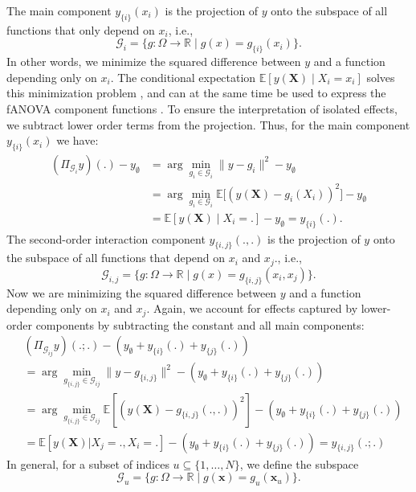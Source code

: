 The main component $y_{\{i\}}(x_i)$ is the projection of $y$ onto the subspace of all 
functions that only depend on $x_i$, i.e.,
\[
\mathcal{G}_i = \{ g : \Omega \to \mathbb{R} \mid g(x) = g_{\{i\}}(x_i) \}.
\]
In other words, we minimize the squared difference between $y$ and a function depending 
only on $x_i$.
The conditional expectation $\mathbb{E}[y(\boldsymbol{X}) \mid X_i = x_i]$ solves this 
minimization problem \citep{Vaart_1998}, and can at the same time be used to 
express the fANOVA component functions \citep{muehlenstaedt2012}. To ensure the interpretation of isolated effects, we subtract lower order terms from the projection.
Thus, for the main component $y_{\{i\}}(x_i)$ we have:
\begin{align*}
    (\Pi_{\mathcal{G}_i}y)(.) - y_{\emptyset}
    &= \arg \min_{g_i \in \mathcal{G}_i} \|y - g_i\|^2 - y_{\emptyset} \\ 
    &= \arg \min_{g_i \in \mathcal{G}_i} 
       \mathbb{E}\!\big[(y(\boldsymbol{X}) - g_i(X_i))^2\big] - y_{\emptyset} \\ 
    &= \mathbb{E}[y(\boldsymbol{X}) \mid X_i = .] - y_{\emptyset} 
       = y_{\{i\}}(.).
\end{align*}
The second-order interaction component $y_{\{i,j\}}(.,.)$ is the projection of $y$ onto the subspace of all functions that depend on $x_i$ and $x_j$., i.e.,
$$\mathcal{G}_{i,j} = \{ g : \Omega \to \mathbb{R} \mid g(x) = g_{\{i,j\}}(x_i, x_j)\}.$$
Now we are minimizing the squared difference between $y$ and a function depending only on $x_i$ and $x_j$. Again, we account for effects captured by lower-order components by subtracting the constant and all main components:
\begin{align*}
    &(\Pi_{\mathcal{G}_{ij}}y)(.;.) - (y_{\emptyset} + y_{\{i\}}(.) + y_{\{j\}}(.)) \\
    &= \arg \min_{g_{\{i,j\}} \in \mathcal{G}_{ij}} \|y - g_{\{i,j\}}\|^2 - (y_{\emptyset} + y_{\{i\}}(.) + y_{\{j\}}(.))\\
    &= \arg \min_{g_{\{i,j\}} \in \mathcal{G}_{ij}} \mathbb{E}[(y(\boldsymbol{X}) - g_{\{i,j\}}(., .))^2] - (y_{\emptyset} + y_{\{i\}}(.) + y_{\{j\}}(.))\\
    &= \mathbb{E}[y(\boldsymbol{X}) | X_j = ., X_i = .] - (y_{\emptyset} + y_{\{i\}}(.) + y_{\{j\}}(.)) = y_{\{i,j\}}(.;.)
\end{align*}
In general, for a subset of indices $u \subseteq \{1, \dots, N\}$, we define the subspace
\[
\mathcal{G}_u = \{ g : \Omega \to \mathbb{R} \mid g(\boldsymbol{x}) = g_u(\boldsymbol{x}_u)\}.
\]
